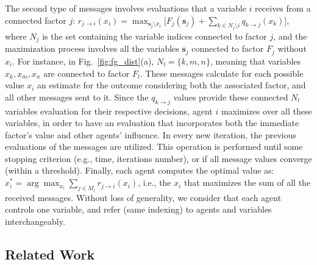The second type of messages involves evaluations that a variable $i$ receives from a connected factor $j$:
$r_{j \rightarrow i}(x_i)=\max_{\mathbf{s}_j\setminus x_i}  \lbrack F_j(\mathbf{s}_j) + \sum_{k \in N_j \setminus i} q_{k \rightarrow j}(x_k)  \rbrack$, where $N_j$ is the set containing the variable indices connected to factor $j$, and the maximization process involves all the variables $\mathbf{s}_j$ connected to factor $F_j$ without $x_i$.
For instance, in Fig.~\ref{fig:fg_dist}(a), $N_l=\{k,m,n\}$, meaning that variables $x_k,x_m,x_n$ are connected to factor $F_l$.
These messages calculate for each possible value $x_i$ an estimate for the outcome considering both the associated factor, and all other messages sent to it. 
Since the $q_{k\rightarrow j}$ values provide these connected $N_l$ variables evaluation for their respective decisions, agent $i$ maximizes over all these variables, in order to have an evaluation that incorporates both the immediate factor's value and other agents' influence.
In every new iteration, the previous evaluations of the messages are utilized.
This operation is performed until some stopping criterion (e.g., time,  iterations number), or if all message values converge (within a threshold).
Finally, each agent computes the optimal value as: $x_i^* = \arg \max_{x_i} \sum_{j \in M_i} r_{j \rightarrow i}(x_i)$, i.e., the $x_i$ that maximizes the sum of all the received messages.
Without loss of generality, we consider that each agent controls one variable, 
and refer (same indexing) to agents and variables interchangeably.

\subsection{Related Work}

